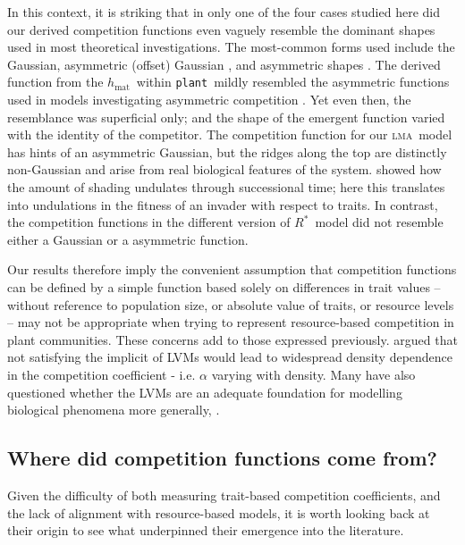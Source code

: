 \documentclass[a4paper,11pt]{article}
\newcommand{\Rstar}{\ensuremath{R^*}}
\newcommand{\plant}{{\tt plant}}
\newcommand{\hmat}{\ensuremath{h_{\text{mat}}}}
\newcommand{\lma}{\textsc{lma}}
\begin{document}
In this context, it is striking that in only one of the four cases studied here did our derived competition functions even vaguely resemble the dominant shapes used in most theoretical investigations. The most-common forms used include the Gaussian, asymmetric (offset) Gaussian \citep{Roughgarden-1979}, and asymmetric shapes \citep[e.g.][]{Kisdi-1999, Law-1997}. The derived function from the \hmat\ within \plant\ mildly resembled the asymmetric functions used in models investigating asymmetric competition \citep{Law-1997, Geritz-1999, Kisdi-1999, Calcagno-2006}. Yet even then, the resemblance was superficial only; and the shape of the emergent function varied with the identity of the competitor. The competition function for our \lma\ model has hints of an asymmetric Gaussian, but the ridges along the top are distinctly non-Gaussian and arise from real biological features of the system. \citet{Falster-2011} showed how the amount of shading undulates through successional time; here this translates into undulations in the fitness of an invader with respect to traits. In contrast, the competition functions in the different version of \Rstar\ model did not resemble either a Gaussian or a asymmetric function.

Our results therefore imply the convenient assumption that competition functions can be defined by a simple function based solely on differences in trait values -- without reference to population size, or absolute value of traits, or resource levels -- may not be appropriate when trying to represent resource-based competition in plant communities. These concerns add to those expressed previously. \citet{Abrams-1980} argued that not satisfying the implicit of LVMs would lead to widespread density dependence in the competition coefficient - i.e. $\alpha$ varying with density. Many have also questioned whether the LVMs are an adequate foundation for modelling biological phenomena more generally, \citep[e.g.][]{Andrewartha-1953, Neill-1974, Abrams-1975, Wangersky-1978,Abrams-1980, Tilman-1987, Abrams-2008}.

\subsection{Where did competition functions come from?}

Given the difficulty of both measuring trait-based competition coefficients, and the lack of alignment with resource-based models, it is worth looking back at their origin to see what underpinned their emergence into the literature.
\end{document}
